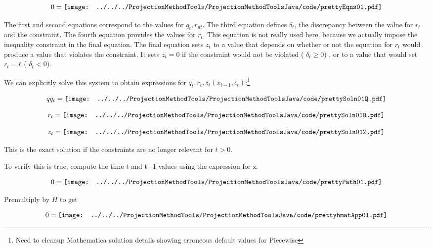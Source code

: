 \documentclass[12pt]{article}
\begin{document}
\begin{gather*}
  0=\vcenter{\hbox{\texttt{[image: ../../../ProjectionMethodTools/ProjectionMethodToolsJava/code/prettyEqns01.pdf]}}}
\end{gather*}
 
The first and second equations correspond to the values for $q_t,r_{ut}$.
The third equation defines $\delta_t$, the discrepancy between the value for $r_t$ and the constraint.    The fourth equation provides the values for $r_t$.  This equation is not really used here, because we actually impose the inequality
constraint in the final equation. The final equation
 sets $z_t$ to a value that depends on 
whether or not the equation for $r_t$ would produce a value that violates the
constraint.  It sets $z_t=0$ if the constraint would  not be violated ( $\delta_t\ge0$) ,  or
to a value that would set $r_t=\bar{r}$ ( $\delta_t<0$).


We can explicitly solve this system to obtain  expressions for $q_t, r_t, z_{t}(x_{t-1},\epsilon_t) $:\footnote{Need to cleanup Mathematica solution details showing erroneous default values for Piecewise}

\begin{gather*}
  qq_t=\vcenter{\hbox{\texttt{[image: ../../../ProjectionMethodTools/ProjectionMethodToolsJava/code/prettySoln01Q.pdf]}}}
\end{gather*}

\begin{gather*}
  r_t=\vcenter{\hbox{\texttt{[image: ../../../ProjectionMethodTools/ProjectionMethodToolsJava/code/prettySoln01R.pdf]}}}
\end{gather*}

\begin{gather*}
  z_t=\vcenter{\hbox{\texttt{[image: ../../../ProjectionMethodTools/ProjectionMethodToolsJava/code/prettySoln01Z.pdf]}}}
\end{gather*}

This is the exact solution if the constraints are no longer relevant for 
$t >0$.

To verify this is true, compute the time t and t+1 values using the expression for z.

\begin{gather*}
  0=\vcenter{\hbox{\texttt{[image: ../../../ProjectionMethodTools/ProjectionMethodToolsJava/code/prettyPath01.pdf]}}}
\end{gather*}

Premultiply by $H$ to get

\begin{gather*}
  0=\vcenter{\hbox{\texttt{[image: ../../../ProjectionMethodTools/ProjectionMethodToolsJava/code/prettyhmatApp01.pdf]}}}
\end{gather*}
\end{document}
